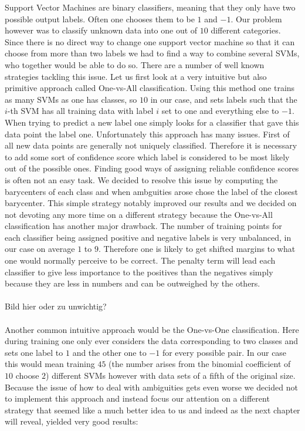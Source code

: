 Support Vector Machines are binary classifiers, meaning that they only have two possible output labels. Often one chooses them to be $1$ and $-1$. Our problem however was to classify unknown data into one out of $10$ different categories. Since there is no direct way to change one support vector machine so that it can choose from more than two labels we had to find a way to combine several SVMs, who together would be able to do so. There are a number of well known strategies tackling this issue. Let us first look at a very intuitive but also primitive approach called One-vs-All classification. Using this method one trains as many SVMs as one has classes, so $10$ in our case, and sets labels such that the $i$-th SVM has all training data with label $i$ set to one and everything else to $-1$. When trying to predict a new label one simply looks for a classifier that gave this data point the label one. Unfortunately this approach has many issues. First of all new data points are generally not uniquely classified. Therefore it is necessary to add some sort of confidence score which label is considered to be most likely out of the possible ones. Finding good ways of assigning reliable confidence scores is often not an easy task. We decided to resolve this issue by computing the barycenters of each class and when ambguities arose chose the label of the closest barycenter. This simple strategy notably improved our results and we decided on not devoting any more time on a different strategy because the One-vs-All classification has another major drawback. The number of training points for each classifier being assigned positive and negative labels is very unbalanced, in our case on average $1$ to $9$. Therefore one is likely to get shifted margins to what one would normally perceive to be correct. The penalty term will lead each classifier to give less importance to the positives than the negatives simply because they are less in numbers and can be outweighed by the others. \\ \\ Bild hier oder zu unwichtig? \\  \\ Another common intuitive approach would be the One-vs-One classification. Here during training one only ever considers the data corresponding to two classes and sets one label to $1$ and the other one to $-1$ for every possible pair. 
In our case this would mean training $45$ (the number arises from the binomial coefficient of $10$ choose $2$) different SVMs however with data sets of a fifth of the original size. Because the issue of how to deal with ambiguities gets even worse we decided not to implement this approach and instead focus our attention on a different strategy that seemed like a much better idea to us and indeed as the next chapter will reveal, yielded very good results:

